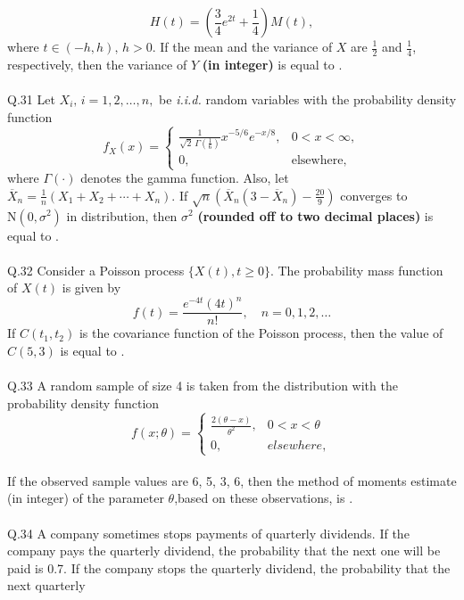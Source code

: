 \documentclass{book}[200pt]
\begin{document}
{\[H(t) = \left( \frac{3}{4} e^{2t} + \frac{1}{4} \right) M(t),
\]
where $t \in (-h,h),\, h > 0$. If the mean and the variance of $X$ are $\frac{1}{2}$ and $\frac{1}{4}$, respectively, then the variance of $Y$ \textbf{(in integer)} is equal to \underline{\hspace{2cm}}.\\
\\
Q.31 Let $X_i, \, i = 1, 2, \ldots, n,$ be \textit{i.i.d.} random variables with the probability density function
\[
f_X(x) = 
\begin{cases} 
	\frac{1}{\sqrt{2}\,\Gamma\left(\frac{1}{6}\right)} x^{-5/6} e^{-x/8}, & 0 < x < \infty, \\
	0, & \text{elsewhere},
\end{cases}
\]
where $\Gamma(\cdot)$ denotes the gamma function. Also, let $\overline{X}_n = \frac{1}{n}(X_1 + X_2 + \cdots + X_n)$. If
$
\sqrt{n} \left( \overline{X}_n \left(3 - \overline{X}_n \right) - \frac{20}{9} \right)
$
converges to $\mathrm{N}(0, \sigma^2)$ in distribution, then $\sigma^2$ \textbf{(rounded off to two decimal places)} is equal to \underline{\hspace{2cm}} .\\
\\
Q.32 Consider a Poisson process $\{X(t), t \geq 0\}$. The probability mass function of $X(t)$ is given by
\[
f(t) = \frac{e^{-4t} (4t)^n}{n!}, \quad n=0,1,2,\dots
\]
If $C(t_1,t_2)$ is the covariance function of the Poisson process, then the value of $C(5,3)$ is equal to \underline{\hspace{2cm}}.\\
\\
Q.33 A random sample of size 4 is taken from the distribution with the probability density
function \[
f(x; \theta) = \begin{cases}
	\frac{2(\theta - x)}{\theta^2}, & 0 < x < \theta \\
	0, & elsewhere,
\end{cases}
\]
\\
If the observed sample values are 6, 5, 3, 6, then the method of moments estimate (in integer) of the parameter $\theta$,based on these observations, is \underline{\hspace{2cm}}.\\
\\
Q.34 A company sometimes stops payments of quarterly dividends. If the company pays
the quarterly dividend, the probability that the next one will be paid is 0.7. If the
company stops the quarterly dividend, the probability that the next quarterly
}
\end{document}

